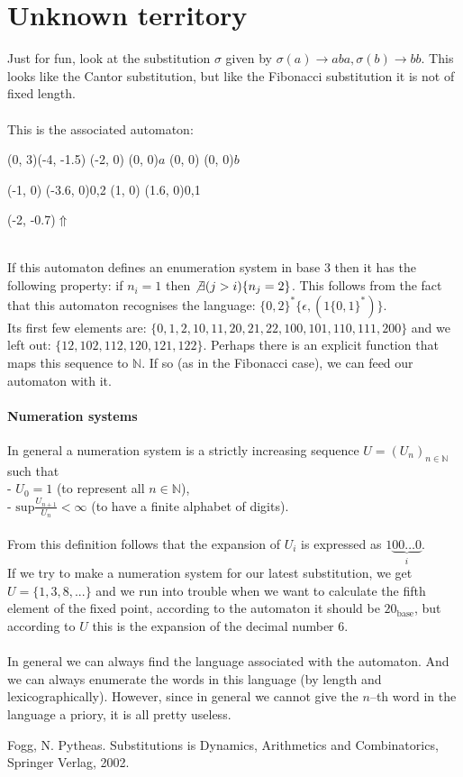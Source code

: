 \documentclass{article}
\begin{document}
\section*{Unknown territory}
Just for fun, look at the substitution $\sigma$ given by 
$\sigma(a) \rightarrow aba, \sigma(b) \rightarrow bb$. This looks like the 
Cantor substitution, but like the Fibonacci substitution it is not of fixed 
length.\\
\\
This is the associated automaton:\\
\begin{graph}(0, 3)(-4, -1.5)
  (-2, 0) (0, 0){$a$}
  (0, 0)  (0, 0){$b$}

  (-1, 0) \freetext(-3.6, 0){0,2}
   
  (1, 0) \freetext(1.6, 0){0,1}

  \freetext(-2, -0.7){$\Uparrow$}
\end{graph}\\
If this automaton defines an enumeration system in base 3 then it has the 
following property: if $n_i = 1$ then $\not\exists (j > i) \{ n_j = 2\}$. This 
follows from the fact that this automaton recognises the language:
$\{0, 2\}^* \{\epsilon, (1\{0, 1\}^*)\}$.\\
Its first few elements are:
$\{0, 1, 2, 10, 11, 20, 21, 22, 100, 101, 110, 111, 200\}$ and we left out:
$\{12, 102, 112, 120, 121, 122\}$. Perhaps there is an explicit function that
maps this sequence to $\mathbb{N}$. If so (as in the Fibonacci case), we can
feed our automaton with it.\\
\paragraph{Numeration systems} In general a numeration system is a strictly
increasing sequence $U = (U_n)_{n \in \mathbb{N}}$ such that\\
- $U_0 = 1$ (to represent all $n \in \mathbb{N}$),\\
- $\mathrm{sup}\frac{U_{n + 1}}{U_n} < \infty$ (to have a finite alphabet of
digits).\\
\\
From this definition follows that the expansion of $U_i$ is expressed as 
$1\underbrace{00\ldots0}_i$.\\
If we try to make a numeration system for our latest substitution, we get
$U = \{1, 3, 8, ...\}$ and we run into trouble when we want to calculate the
fifth element of the fixed point, according to the automaton it should be
$20_{\mathrm{base}}$, but according to $U$ this is the expansion of the 
decimal number 6.\\
\\
In general we can always find the language associated with the automaton. And
we can always enumerate the words in this language (by length and
lexicographically). However, since in general we cannot give the $n$--th word
in the language a priory, it is all pretty useless.

\begin{thebibliography}{XX}
 Fogg, N. Pytheas. Substitutions is Dynamics, Arithmetics and 
               Combinatorics, Springer Verlag, 2002.
\end{thebibliography}
\end{document}
